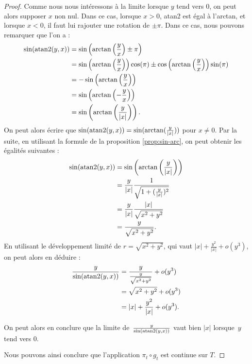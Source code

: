 \documentclass[hidelinks, 10pt]{article}
\begin{document}
\begin{proof}
\bigskip Comme nous nous intéressons à la limite lorsque $y$ tend vers 0, on peut alors supposer $x$ non nul. Dans ce cas, lorsque $x>0$, atan2 est égal à l'arctan, et lorsque $x<0$, il faut lui rajouter une rotation de $\pm\pi$. Dans ce cas, nous pouvons remarquer que l'on a :\[\begin{split}
\sin(\mathrm{atan}2(y,x))&=\sin\left(\arctan\left(\frac{y}{x}\right)\pm\pi\right)\\
&=\sin\left(\arctan\left(\frac{y}{x}\right)\right)\cos(\pi)\pm\cos\left(\arctan\left(\frac{y}{x}\right)\right)\sin(\pi)\\
&=-\sin\left(\arctan\left(\frac{y}{x}\right)\right)\\
&=\sin\left(\arctan\left(-\frac{y}{x}\right)\right)\\
&=\sin\left(\arctan\left(\frac{y}{|x|}\right)\right).
\end{split}\]On peut alors écrire que $\sin(\mathrm{atan}2(y,x))=\sin(\arctan(\frac{y}{|x|}))$ pour $x\neq0$. Par la suite, en utilisant la formule de la proposition \ref{prop:sin-arc}, on peut obtenir les égalités suivantes :\[\begin{split}
\sin(\mathrm{atan}2(y,x))&=\sin\left(\arctan\left(\frac{y}{|x|}\right)\right)\\
&=\frac{y}{|x|}\frac{1}{\sqrt{1+(\frac{y}{|x|})^2}}\\
&=\frac{y}{|x|}\frac{|x|}{\sqrt{x^2+y^2}}\\
&=\frac{y}{\sqrt{x^2+y^2}}.
\end{split}\]En utilisant le développement limité de $r=\sqrt{x^2+y^2}$, qui vaut $|x|+\frac{y^2}{|x|}+o(y^3)$, on peut alors en déduire : \[\begin{split}
\frac{y}{\sin(\mathrm{atan}2(y,x))}&=\frac{y}{\frac{y}{\sqrt{x^2+y^2}}}+o(y^3)\\
&=\sqrt{x^2+y^2}+o(y^3)\\
&=|x|+\frac{y^2}{|x|}+o(y^3).
\end{split}\] 

On peut alors en conclure que la limite de~$\frac{y}{\sin(\mathrm{atan}2(y,x))}$ vaut bien $|x|$ lorsque~$y$ tend vers 0.

Nous pouvons ainsi conclure que l'application $\pi_t\circ g_t$ est continue sur $T$.
\end{proof}
\end{document}
